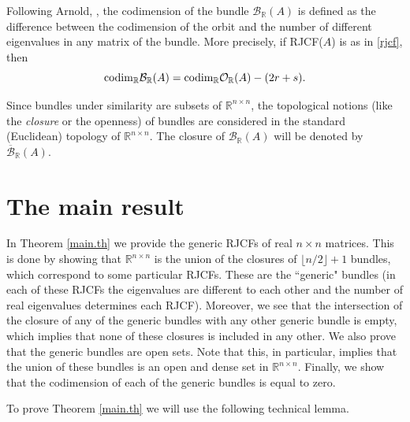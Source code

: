 \documentclass[a4paper]{article}
\newcommand{\R}{\mathbb R}
\newcommand{\orbr}{{\mathcal O}_{\R}}
\newcommand{\bunr}{{\mathcal B}_{\R}}
\newcommand{\cbunr}{{\overline{\mathcal B}}_{\R}}
\newcommand{\cod}{{\rm codim}_\R}
\begin{document}
Following Arnold, \cite[\S5.5]{arnold71}, the codimension of the bundle $\bunr(A)$ is defined as the difference between the codimension of the orbit and the number of different eigenvalues in any matrix of the bundle. More precisely, if  RJCF($A$) is as in \eqref{rjcf}, then
\begin{equation} \label{eq.codimbund}
\cod\bunr(A)=\cod\orbr(A)-(2r+s).
\end{equation}

Since bundles under similarity are subsets of $\R^{n\times n}$, the topological notions (like the {\em closure} or the openness) of bundles are considered in the standard (Euclidean) topology of $\R^{n\times n}$. The closure of $\bunr(A)$ will be denoted by $\cbunr(A)$.

\section{The main result}\label{main.sec}

In Theorem \ref{main.th} we provide the generic RJCFs of real $n\times n$ matrices. This is done by showing that $\R^{n\times n}$ is the union of the closures of $\lfloor n/2\rfloor+1$ bundles, which correspond to some particular RJCFs. These are the ``generic" bundles (in each of these RJCFs the eigenvalues are different to each other and the number of real eigenvalues determines each RJCF). Moreover, we see that the intersection of the closure of any of the generic bundles with any other generic bundle is empty, which implies that none of these closures is included in any other. We also prove that the generic bundles are open sets. Note that this, in particular, implies that the union of these bundles is an open and dense set in $\R^{n\times n}$. Finally, we show that the codimension of each of the generic bundles is equal to  zero.

To prove Theorem \ref{main.th} we will use the following technical lemma.
\end{document}
